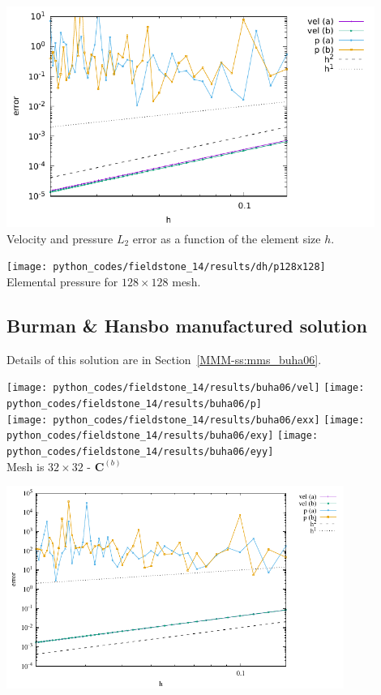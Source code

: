 \begin{center}
\includegraphics[width=12cm]{python_codes/fieldstone_14/results/dh/errors.pdf}\\
{\captionfont Velocity and pressure $L_2$ error as a function of the element size $h$.}
\end{center}


\begin{center}
\texttt{[image: python\_codes/fieldstone\_14/results/dh/p128x128]}\\
{\captionfont Elemental pressure for $128\times 128$ mesh.}
\end{center}

\newpage
\subsection*{Burman \& Hansbo manufactured solution}

Details of this solution are in Section~\ref{MMM-ss:mms_buha06}.


\begin{center}
\texttt{[image: python\_codes/fieldstone\_14/results/buha06/vel]}
\texttt{[image: python\_codes/fieldstone\_14/results/buha06/p]}\\
\texttt{[image: python\_codes/fieldstone\_14/results/buha06/exx]}
\texttt{[image: python\_codes/fieldstone\_14/results/buha06/exy]}
\texttt{[image: python\_codes/fieldstone\_14/results/buha06/eyy]}\\
{\captionfont Mesh is $32\times 32$ - ${\bm C}^{(b)}$}
\end{center}


\begin{center}
\includegraphics[width=11cm]{python_codes/fieldstone_14/results/buha06/errors.pdf}
\end{center}

